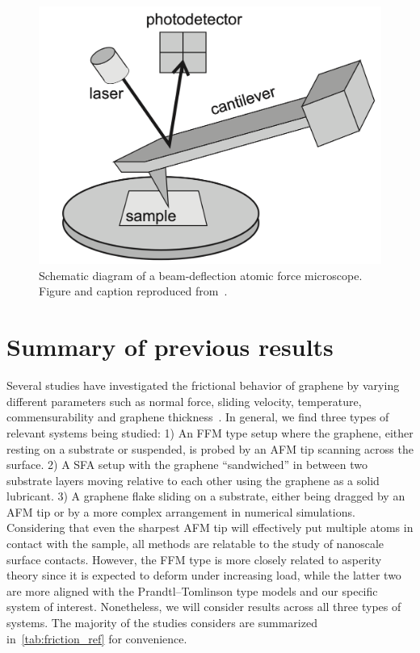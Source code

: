 \begin{figure}[!htb]
  \centering
  \includegraphics[width=0.5\linewidth]{figures/theory/AFM.png}
  \caption{Schematic diagram of a beam-deflection atomic force microscope. Figure and caption reproduced from~\cite[p. 184]{gnecco_meyer_2015}.}
  \label{fig:AFM}
\end{figure}



\section{Summary of previous results}\label{sec:prev_results}
Several studies have investigated the frictional behavior of graphene by varying
different parameters such as normal force, sliding velocity, temperature,
commensurability and graphene thickness~\cite{penkov_tribology_2014}. In
general, we find three types of relevant systems being studied: 1) An
\acrshort{FFM} type setup where the graphene, either resting on a substrate or
suspended, is probed by an \acrshort{AFM} tip scanning across the surface. 2) A
\acrshort{SFA} setup with the graphene ``sandwiched'' in between two substrate
layers moving relative to each other using the graphene as a solid lubricant. 3)
A graphene flake sliding on a substrate, either being dragged by an
\acrshort{AFM} tip or by a more complex arrangement in numerical simulations.
Considering that even the sharpest \acrshort{AFM} tip will effectively put
multiple atoms in contact with the sample, all methods are relatable to the
study of nanoscale surface contacts. However, the \acrshort{FFM} type is more
closely related to asperity theory since it is expected to deform under
increasing load, while the latter two are more aligned with the
Prandtl–Tomlinson type models and our specific system of interest. Nonetheless,
we will consider results across all three types of systems. The majority of the studies considers are summarized in~\cref{tab:friction_ref} for convenience. 


